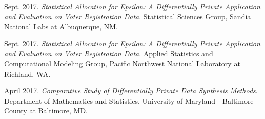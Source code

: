 \documentclass[11pt, letterpaper, roman]{moderncv} %
\begin{document}
\begin{etaremune}[topsep=0pt, itemsep=3pt, partopsep=0pt, parsep=0pt]
    \item Sept. 2017. \textit{Statistical Allocation for Epsilon: A Differentially Private Application and Evaluation on Voter Registration Data}. Statistical Sciences Group, Sandia National Labs at Albuquerque, NM.
    
    \item Sept. 2017. \textit{Statistical Allocation for Epsilon: A Differentially Private Application and Evaluation on Voter Registration Data}. Applied Statistics and Computational Modeling Group, Pacific Northwest National Laboratory at Richland, WA.
    
    \item April 2017. \textit{Comparative Study of Differentially Private Data Synthesis Methods}. Department of Mathematics and Statistics, University of Maryland - Baltimore County at Baltimore, MD.
\end{etaremune}

\end{document}
